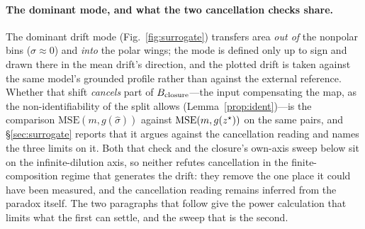 \paragraph{The dominant mode, and what the two cancellation checks share.} The dominant drift mode
(Fig.~\ref{fig:surrogate}) transfers area \emph{out of} the nonpolar bins ($\sigma\!\approx\!0$) and
\emph{into} the polar wings; the mode is defined only up to sign and drawn there in the mean drift's
direction, and the plotted drift is taken against the same model's grounded profile rather than
against the external reference. Whether that shift \emph{cancels} part of $B_{\mathrm{closure}}$---the input
compensating the map, as the non-identifiability of the split allows
(Lemma~\ref{prop:ident})---is the comparison $\mathrm{MSE}(m,g(\hat\sigma))$ against
$\mathrm{MSE}(m,g(z^\star))$ on the same pairs, and \S\ref{sec:surrogate} reports that it argues
against the cancellation reading and names the three limits on it. Both that check and the
closure's own-axis sweep below sit on the infinite-dilution axis, so neither refutes cancellation in
the finite-composition regime that generates the drift: they remove the one place it could have been
measured, and the cancellation reading remains inferred from the paradox itself. The two paragraphs
that follow give the power calculation that limits what the first can settle, and the sweep that is
the second.


